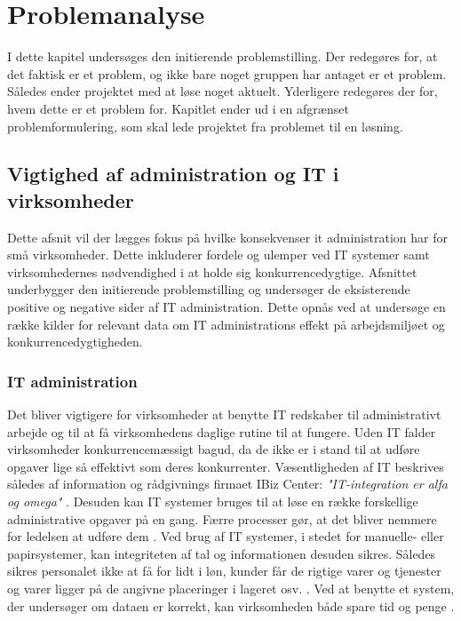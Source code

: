 \chapter{Problemanalyse}\label{ch:analyse}
I dette kapitel undersøges den initierende problemstilling. Der redegøres for, at det faktisk er et problem, og ikke bare noget gruppen har antaget er et problem. Således ender projektet med at løse noget aktuelt. Yderligere redegøres der for, hvem dette er et problem for. Kapitlet ender ud i en afgrænset problemformulering, som skal lede projektet fra problemet til en løsning.

\section{Vigtighed af administration og IT i virksomheder}
%
%
Dette afsnit vil der lægges fokus på hvilke konsekvenser it administration har for små virksomheder. Dette inkluderer fordele og ulemper ved IT systemer samt virksomhedernes nødvendighed i at holde sig konkurrencedygtige. Afsnittet underbygger den initierende problemstilling og undersøger de eksisterende positive og negative sider af IT administration. Dette opnås ved at undersøge en række kilder for relevant data om IT administrations effekt på arbejdsmiljøet og konkurrencedygtigheden.

\subsection{IT administration}
Det bliver vigtigere for virksomheder at benytte IT redskaber til administrativt arbejde og til at få virksomhedens daglige rutine til at fungere. Uden IT falder virksomheder konkurrencemæssigt bagud, da de ikke er i stand til at udføre opgaver lige så effektivt som deres konkurrenter. Væsentligheden af IT beskrives således af information og rådgivnings firmaet IBiz Center: \textit{"IT-integration er alfa og omega"} \citep{case_green_team}. Desuden kan IT systemer bruges til at løse en række forskellige administrative opgaver på en gang. Færre processer gør, at det bliver nemmere for ledelsen at udføre dem \citep{Ibiz_streamline}. Ved brug af IT systemer, i stedet for manuelle- eller papirsystemer, kan integriteten af tal og informationen desuden sikres. Således sikres personalet ikke at få for lidt i løn, kunder får de rigtige varer og tjenester og varer ligger på de angivne placeringer i lageret osv. \citep{Ibiz_streamline}. Ved at benytte et system, der undersøger om dataen er korrekt, kan virksomheden både spare tid og penge \citep{case_green_team}. 

